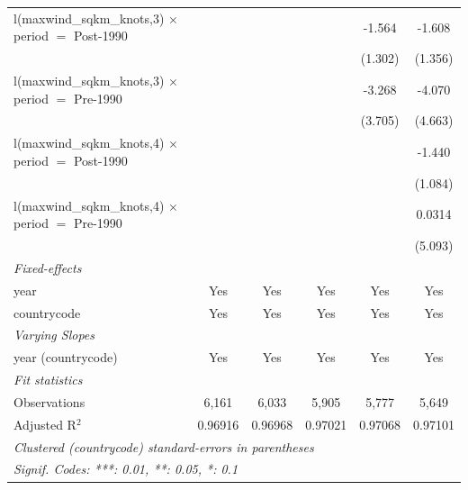 \begin{tabular}{lccccc}
   l(maxwind\_sqkm\_knots,3) $\times$ period $=$ Post-1990    &               &                &                & -1.564         & -1.608\\   
                                                              &               &                &                & (1.302)        & (1.356)\\   
   l(maxwind\_sqkm\_knots,3) $\times$ period $=$ Pre-1990     &               &                &                & -3.268         & -4.070\\   
                                                              &               &                &                & (3.705)        & (4.663)\\   
   l(maxwind\_sqkm\_knots,4) $\times$ period $=$ Post-1990    &               &                &                &                & -1.440\\   
                                                              &               &                &                &                & (1.084)\\   
   l(maxwind\_sqkm\_knots,4) $\times$ period $=$ Pre-1990     &               &                &                &                & 0.0314\\   
                                                              &               &                &                &                & (5.093)\\   
   \midrule
   \emph{Fixed-effects}\\
   year                                                       & Yes           & Yes            & Yes            & Yes            & Yes\\  
   countrycode                                                & Yes           & Yes            & Yes            & Yes            & Yes\\  
   \midrule
   \emph{Varying Slopes}\\
   year (countrycode)                                         & Yes           & Yes            & Yes            & Yes            & Yes\\  
   \midrule
   \emph{Fit statistics}\\
   Observations                                               & 6,161         & 6,033          & 5,905          & 5,777          & 5,649\\  
   Adjusted R$^2$                                             & 0.96916       & 0.96968        & 0.97021        & 0.97068        & 0.97101\\  
   \midrule \midrule
   \multicolumn{6}{l}{\emph{Clustered (countrycode) standard-errors in parentheses}}\\
   \multicolumn{6}{l}{\emph{Signif. Codes: ***: 0.01, **: 0.05, *: 0.1}}\\
\end{tabular}
\par\endgroup



